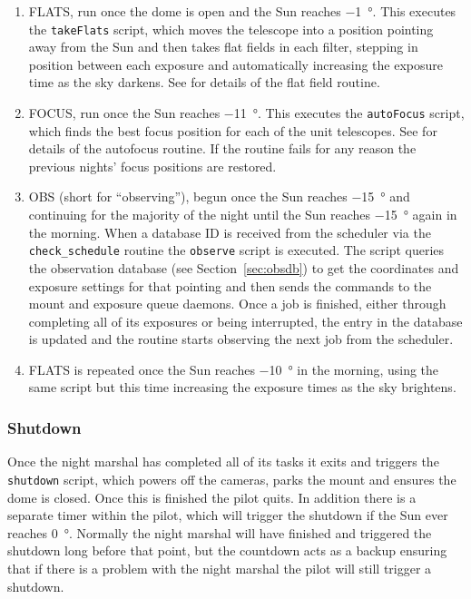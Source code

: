 \begin{colsection}
\begin{colsection}
\begin{enumerate}
\item FLATS, run once the dome is open and the Sun reaches \SI{-1}{\degree}. This executes the \texttt{takeFlats} script, which moves the telescope into a position pointing away from the Sun and then takes flat fields in each filter, stepping in position between each exposure and automatically increasing the exposure time as the sky darkens. See  for details of the flat field routine.

\item FOCUS, run once the Sun reaches \SI{-11}{\degree}. This executes the \texttt{autoFocus} script, which finds the best focus position for each of the unit telescopes. See  for details of the autofocus routine. If the routine fails for any reason the previous nights' focus positions are restored.

\item OBS (short for ``observing''), begun once the Sun reaches \SI{-15}{\degree} and continuing for the majority of the night until the Sun reaches \SI{-15}{\degree} again in the morning. When a database ID is received from the scheduler via the \texttt{check\_schedule} routine the \texttt{observe} script is executed. The script queries the observation database (see Section~\ref{sec:obsdb}) to get the coordinates and exposure settings for that pointing and then sends the commands to the mount and exposure queue daemons. Once a job is finished, either through completing all of its exposures or being interrupted, the entry in the database is updated and the routine starts observing the next job from the scheduler.

\item FLATS is repeated once the Sun reaches \SI{-10}{\degree} in the morning, using the same script but this time increasing the exposure times as the sky brightens.

\end{enumerate}

\subsubsection{Shutdown}

Once the night marshal has completed all of its tasks it exits and triggers the \texttt{shutdown} script, which powers off the cameras, parks the mount and ensures the dome is closed. Once this is finished the pilot quits. In addition there is a separate  timer within the pilot, which will trigger the shutdown if the Sun ever reaches \SI{0}{\degree}. Normally the night marshal will have finished and triggered the shutdown long before that point, but the countdown acts as a backup ensuring that if there is a problem with the night marshal the pilot will still trigger a shutdown.


\end{colsection}
\end{colsection}
